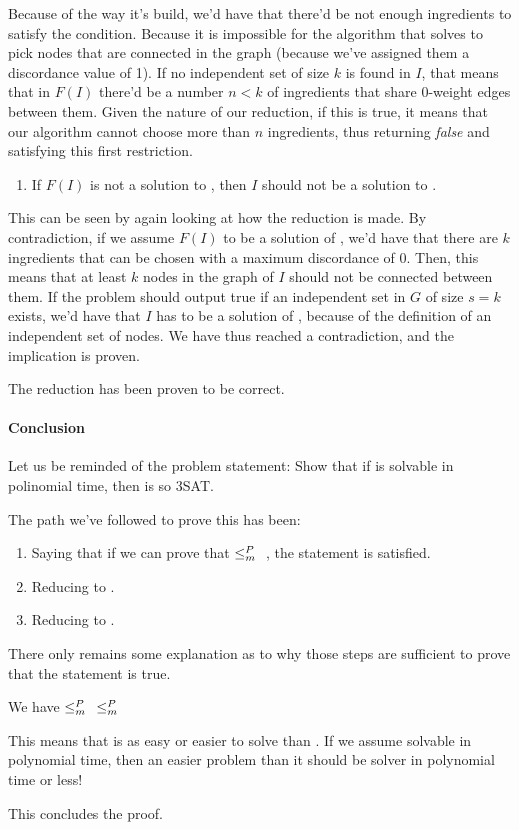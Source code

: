 Because of the way it's build, we'd have that there'd be not enough ingredients to satisfy the condition. Because it is impossible for the algorithm that solves \exc{} to pick nodes that are connected in the graph (because we've assigned them a discordance value of 1). If no independent set of size $k$ is found in $I$, that means that  in $F(I)$ there'd be a number $n < k$ of ingredients that share 0-weight edges between them. Given the nature of our reduction, if this is true, it means that our algorithm cannot choose more than $n$ ingredients, thus returning \textit{false} and satisfying this first restriction.

\begin{enumerate}[resume]
  \item If $F(I)$ is not a solution to \exc{}, then $I$ should not be a solution to \is{}.
\end{enumerate}

This can be seen by again looking at how the reduction is made. By contradiction, if we assume $F(I)$ to be a solution of \exc{}, we'd have that there are $k$ ingredients that can be chosen with a maximum discordance of 0. Then, this means that at least $k$ nodes in the graph of $I$ should not be connected between them. If the problem should output true if an independent set in $G$ of size $s = k$ exists, we'd have that $I$ has to be a solution of \is{}, because of the definition of an independent set of nodes. We have thus reached a contradiction, and the implication is proven.

The reduction has been proven to be correct.

\paragraph{Conclusion}

Let us be reminded of the problem statement: Show that if \exc{} is solvable in polinomial time, then is so 3SAT.

The path we've followed to prove this has been:

\begin{enumerate}
  \item Saying that if we can prove that \tsat{} $\leq_m^P{}$ \exc{}, the statement is satisfied.
  \item Reducing \tsat{} to \is{}.
  \item Reducing \is{} to \exc{}.
\end{enumerate}

There only remains some explanation as to why those steps are sufficient to prove that the statement is true.

We have \tsat{} $\leq_m^P{}$ \is{} $\leq_m^P{}$ \exc{}

This means that \tsat{} is as easy or easier to solve than \exc{}. If we assume \exc{} solvable in polynomial time, then an easier problem than it should be solver in polynomial time or less!

This concludes the proof.

